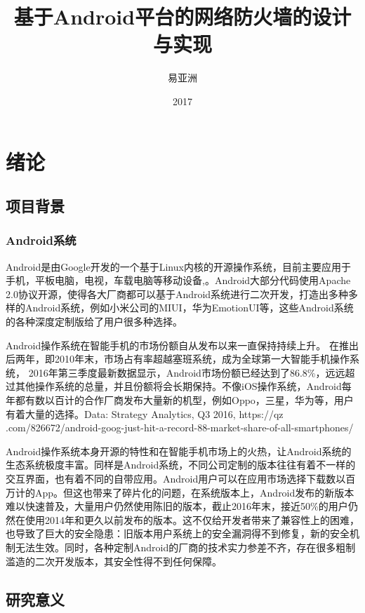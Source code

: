 \documentclass[format=final, language=chinese, degree=bachelor]{hustthesis}
\title{基于Android平台的网络防火墙的设计与实现}{An Implementation of Android Firewall}
\author{易亚洲}{Yazhou Yi}
\date{2017}{6}{1}
\begin{document}
\frontmatter
\maketitle
\makeabstract
\tableofcontents
\listoffigures
\listoftables
\mainmatter

\chapter{绪论}\label{chapter:1}
\section{项目背景}

\subsection{Android系统}
Android是由Google开发的一个基于Linux内核的开源操作系统，目前主要应用于手机，平板电脑，电视，车载电脑等移动设备,。Android大部分代码使用Apache 2.0协议开源，使得各大厂商都可以基于Android系统进行二次开发，打造出多种多样的Android系统，例如小米公司的MIUI，华为EmotionUI等，这些Android系统的各种深度定制版给了用户很多种选择。

Android操作系统在智能手机的市场份额自从发布以来一直保持持续上升。
在推出后两年，即2010年末，市场占有率超越塞班系统，成为全球第一大智能手机操作系统，
2016年第三季度最新数据显示，Android市场份额已经达到了86.8\%，远远超过其他操作系统的总量，并且份额将会长期保持。不像iOS操作系统，Android每年都有数以百计的合作厂商发布大量新的机型，例如Oppo，三星，华为等，用户有着大量的选择。Data: Strategy Analytics, Q3 2016, https://qz
.com/826672/android-goog-just-hit-a-record-88-market-share-of-all-smartphones/

Android操作系统本身开源的特性和在智能手机市场上的火热，让Android系统的生态系统极度丰富。同样是Android系统，不同公司定制的版本往往有着不一样的交互界面，也有着不同的自带应用。Android用户可以在应用市场选择下载数以百万计的App。但这也带来了碎片化的问题，在系统版本上，Android发布的新版本难以快速普及，大量用户仍然使用陈旧的版本，截止2016年末，接近50\%的用户仍然在使用2014年和更久以前发布的版本。这不仅给开发者带来了兼容性上的困难，也导致了巨大的安全隐患：旧版本用户系统上的安全漏洞得不到修复，新的安全机制无法生效。同时，各种定制Android的厂商的技术实力参差不齐，存在很多粗制滥造的二次开发版本，其安全性得不到任何保障。


\section{研究意义}
\end{document}
